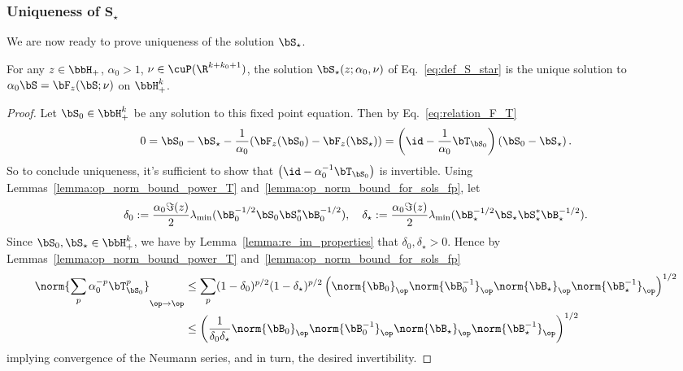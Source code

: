 \subsubsection{Uniqueness of \texorpdfstring{$\mathbf{S_\star}$}{S*}}
\label{app:sec:UniquenessSstar}
We are now ready to prove uniqueness of the solution $\bS_\star$.
\begin{lemma}
\label{lemma:uniqueness_ST}
    For any $z\in\bbH_+$, $\alpha_0 >1$, $\nu\in\cuP(\R^{k+k_0+1})$, the solution $\bS_\star(z;\alpha_0,\nu)$ of Eq.~\eqref{eq:def_S_star} is the unique solution to $\alpha_0 \bS = \bF_z(\bS;\nu)$ on $\bbH_+^k$.
\end{lemma}
\begin{proof}


Let $\bS_0 \in\bbH_+^k$ be any solution to this fixed point equation.  Then by Eq.~\eqref{eq:relation_F_T}
    \begin{equation}
\label{eq:diff_two_sols}
0 = \bS_0 - \bS_\star - \frac1{\alpha_0} (\bF_z(\bS_0) -\bF_z(\bS_\star)) = \left(\id - \frac1{\alpha_0} \bT_{\bS_0}\right)\left(\bS_0 -\bS_\star\right).
    \end{equation}
So to conclude uniqueness, it's sufficient to show that $\left(\id - \alpha_0^{-1} \bT_{\bS_0}\right)$ is invertible.
Using Lemmas~\ref{lemma:op_norm_bound_power_T} and~\ref{lemma:op_norm_bound_for_sols_fp}, let
\begin{equation}
\nonumber
    \delta_0 := \frac{\alpha_0\Im(z)}{2} \lambda_{\min}(\bB_0^{-1/2}\bS_0 \bS_0^* \bB_0^{-1/2}),
    \quad
    \delta_\star := \frac{\alpha_0\Im(z)}{2} \lambda_{\min}(\bB_\star^{-1/2}\bS_\star \bS_\star^* \bB_\star^{-1/2}).
\end{equation}
Since $\bS_0,\bS_\star \in\bbH_+^k$, we have
by Lemma~\ref{lemma:re_im_properties} that $\delta_0,\delta_\star > 0$.
Hence by Lemmas~\ref{lemma:op_norm_bound_power_T} and~\ref{lemma:op_norm_bound_for_sols_fp} 
\begin{align*}
    \norm{\sum_{p}\alpha_0^{-p} \bT_{\bS_0}^p}_{\op\to\op}  &\le \sum_{p} (1-\delta_0)^{p/2}(1-\delta_\star)^{p/2} \left(\norm{\bB_0}_\op \norm{\bB_0^{-1}}_\op  \norm{\bB_\star}_\op \norm{\bB_\star^{-1}}_\op\right)^{1/2} \\&\le 
    \left( \frac1{\delta_0 \delta_\star}\norm{\bB_0}_\op \norm{\bB_0^{-1}}_\op  \norm{\bB_\star}_\op \norm{\bB_\star^{-1}}_\op\right)^{1/2}  
\end{align*}
implying convergence of the Neumann series, and in turn, the desired invertibility.
\end{proof}


